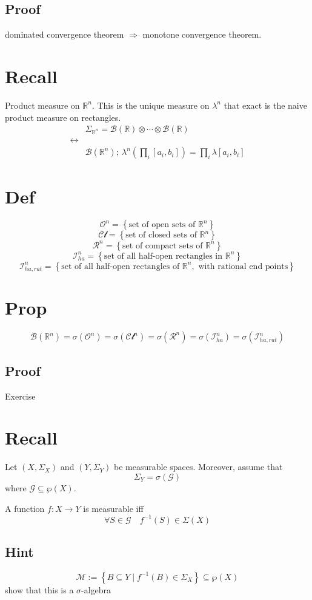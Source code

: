\documentclass{book}
\begin{document}
\subsection*{Proof}
dominated convergence theorem $\Rightarrow$ monotone convergence theorem.
\section{Recall}
Product measure on $\mathbb{R}^n$. This is the unique measure on $\lambda^n$ that exact is the naive product measure on rectangles.
$$
\begin{aligned}
    &\Sigma_{\mathbb{R}^n}=\mathscr{B}(\mathbb R)\otimes\cdots\otimes\mathscr{B}(\mathbb{R})\\
    \leftrightarrow&\\
    &\mathscr{B}(\mathbb R ^n);\ \lambda^n(\prod\limits_i[a_i,b_i])=\prod\limits_i\lambda[a_i,b_i]
\end{aligned}
$$
\section{Def}
$$\mathscr{O}^n=\left\{\text{set of open sets of } \mathbb{R}^n\right\}$$
$$\mathscr{Cl}=\left\{\text{set of closed sets of } \mathbb{R}^n\right\}$$
$$\mathscr{R}^n=\left\{ \text{set  of compact sets of }\mathbb{R}^n\right\}$$
$$\mathscr{I}_{ha}^n=\left\{\text{set of all half-open rectangles in }\mathbb{R}^n\right\}$$
$$\mathscr{I}^n_{ha,rat}=\left\{\text{set of all half-open rectangles of }\mathbb{R}^n,\text{ with rational end points}\right\}$$
\section{Prop}
$$\mathscr{B}(\mathbb{R}^n)=\sigma(\mathscr{O}^n)=\sigma(\mathscr{Cl}^n)=\sigma(\mathscr{R}^n)=\sigma(\mathscr{I}_{ha}^n)=\sigma(\mathscr{I}_{ha,rat}^n)$$
\subsection*{Proof}Exercise
\section{Recall}
Let $(X,\Sigma_X)$ and  $(Y,\Sigma_Y)$ be measurable spaces. Moreover, assume that $$\Sigma_Y=\sigma(\mathcal{G})$$ where $\mathcal{G}\subseteq\wp(X)$.

A function $f:X\rightarrow Y$ is measurable iff
$$\forall S\in \mathcal{G}\quad f^{-1}(S)\in \Sigma(X)$$
\subsection*{Hint}$$\mathscr{M}:=\left\{B\subseteq Y\mid f^{-1}(B)\in \Sigma_X\right\}\subseteq\wp(X)$$
show that this is a $\sigma$-algebra
\end{document}
